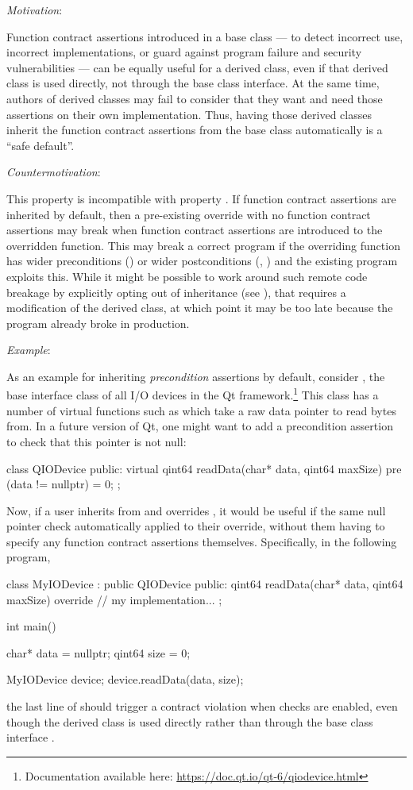\emph{Motivation}:

Function contract assertions introduced in a base class --- to detect incorrect use, incorrect implementations, or guard against program failure and security vulnerabilities --- can be equally useful for a derived class, even if that derived class is used directly, not through the base class interface.  At the same time, authors of derived classes may fail to consider that they want and need those assertions on their own implementation. Thus, having those derived classes inherit the function contract assertions from the base class automatically is a ``safe default''.

\emph{Countermotivation}:

This property is incompatible with property . If function contract assertions are inherited by default, then a pre-existing override with no function contract assertions may break when function contract assertions are introduced to the overridden function. This may break a correct program if the overriding function has wider preconditions () or wider postconditions (, ) and the existing program exploits this. While it might be possible to work around such remote code breakage by explicitly opting out of inheritance (see ), that requires a modification of the derived class, at which point it may be too late because the program already broke in production.

\emph{Example}:

As an example for inheriting \emph{precondition} assertions by default, consider , the base interface class of all I/O devices in the Qt framework.\footnote{Documentation available here: \url{https://doc.qt.io/qt-6/qiodevice.html}} This class has a number of virtual functions such as  which take a raw data pointer to read bytes from. In a future version of Qt, one might want to add a precondition assertion to check that this pointer is not null:
\begin{codeblock}
class QIODevice {
public:
  virtual qint64 readData(char* data, qint64 maxSize)
    pre (data != nullptr) = 0;
};
\end{codeblock}
Now, if a user inherits from  and overrides , it would be useful if the same null pointer check automatically applied to their override, without them having to specify any function contract assertions themselves. Specifically, in the following program,
\begin{codeblock}
class MyIODevice : public QIODevice {
public:
  qint64 readData(char* data, qint64 maxSize) override {
    // my implementation...
  }
};

int main() {
  char* data = nullptr;
  qint64 size = 0;
  
  MyIODevice device;
  device.readData(data, size);
}
\end{codeblock}
the last line of  should trigger a contract violation when checks are enabled, even though the derived class  is used directly rather than through the base class interface . 

